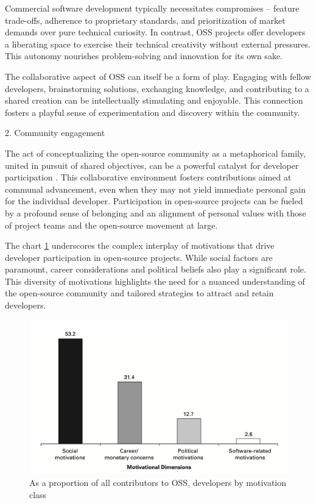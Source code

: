 Commercial software development typically necessitates compromises – feature trade-offs, adherence to proprietary standards, and prioritization of market demands over pure technical curiosity. In contrast, OSS projects offer developers a liberating space to exercise their technical creativity without external pressures. This autonomy nourishes problem-solving and innovation for its own sake.

The collaborative aspect of OSS can itself be a form of play.  Engaging with fellow developers, brainstorming solutions, exchanging knowledge, and contributing to a shared creation can be intellectually stimulating and enjoyable. This connection fosters a playful sense of experimentation and discovery within the community.


2. Community engagement

The act of conceptualizing the open-source community as a metaphorical family, united in pursuit of shared objectives, can be a powerful catalyst for developer participation \parencite{05bitzer2007intrinsic,07zhao2024openrank, 08zhang2024paid, 09lakhani2005hackers, 13li2012leadership, 16ke2008motivations, 17alexander2002working}. This collaborative environment fosters contributions aimed at communal advancement, even when they may not yield immediate personal gain for the individual developer. Participation in open-source projects can be fueled by a profound sense of belonging and an alignment of personal values with those of project teams and the open-source movement at large.

The chart \ref{fig:motivationDimension} underscores the complex interplay of motivations that drive developer participation in open-source projects. While social factors are paramount, career considerations and political beliefs also play a significant role. This diversity of motivations highlights the need for a nuanced understanding of the open-source community and tailored strategies to attract and retain developers.

\begin{figure}[ht]
    \centering
    \includegraphics[width=0.7\linewidth]{figs/motivationDimension.png}
    \caption{As a proportion of all contributors to OSS, developers by motivation class \citep{ghosh2002free}}
    \label{fig:motivationDimension}
\end{figure}

